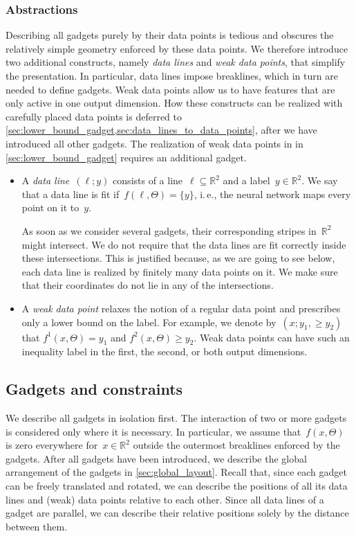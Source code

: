 \documentclass[11pt]{article}
\numberwithin{equation}{section}
\theoremstyle{definition}
\theoremstyle{plain}
\newcommand{\R}{\mathbb R}
\newcommand{\ie}{i.\,e.}
\theoremstyle{plain}
\begin{document}
\subsubsection{Abstractions}
Describing all gadgets purely by their data points is tedious and obscures the relatively simple geometry enforced by these data points.
We therefore introduce two additional constructs, namely \emph{data lines} and \emph{weak data points}, that simplify the presentation.
In particular, data lines impose breaklines, which in turn are needed to define gadgets.
Weak data points allow us to have features that are only active in one output dimension.
How these constructs can be realized with carefully placed data points is deferred to \cref{sec:lower_bound_gadget,sec:data_lines_to_data_points}, after we have introduced all other gadgets. The realization of weak data points in in \cref{sec:lower_bound_gadget} requires an additional gadget.

\begin{itemize}
    \item A \emph{data line}~$(\ell; y)$ consists of a line~$\ell \subseteq \R^2$ and a label~$y \in \R^2$.
    We say that a data line is fit if~$f(\ell, \Theta) = \{y\}$, \ie, the neural network maps every point on it to~$y$.
    
    As soon as we consider several gadgets, their corresponding stripes in~$\R^2$ might intersect.
    We do not require that the data lines are fit correctly inside these intersections.
    This is justified because, as we are going to see below, each data line is realized by finitely many data points on it.
    We make sure that their coordinates do not lie in any of the intersections.

    \item A \emph{weak data point} relaxes the notion of a regular data point and prescribes only a lower bound on the label.
    For example, we denote by~$(x; y_1, \geq y_2)$ that $f^1(x, \Theta) = y_1$ and $f^2(x, \Theta) \geq y_2$.
    Weak data points can have such an inequality label in the first, the second, or both output dimensions.
\end{itemize}

\subsection{Gadgets and constraints}
\label{sec:gadgets}

We describe all gadgets in isolation first.
The interaction of two or more gadgets is considered only where it is necessary.
In particular, we assume that~$f(x, \Theta)$ is %
zero everywhere %
for~$x \in \R^2$ outside the outermost breaklines enforced by %
%
%
%
the gadgets.  %
After all gadgets have been introduced, we describe the global arrangement of the gadgets in \cref{sec:global_layout}.
Recall that, since each gadget can be freely translated and rotated, we can describe the positions of all its data lines and (weak) data points relative to each other.
Since all data lines of a gadget are parallel, we can describe their relative positions solely by the distance between them.
\end{document}
